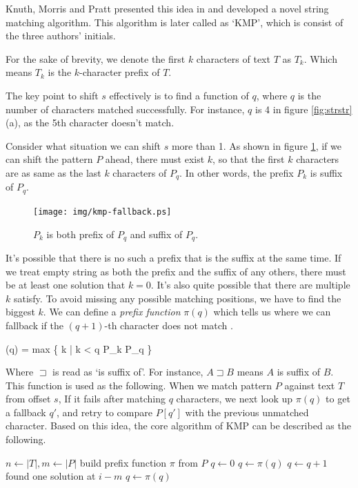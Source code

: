 \documentclass[UTF8]{article}
\begin{document}
Knuth, Morris and Pratt presented this idea in \cite{kmp} and developed a novel string matching algorithm.
This algorithm is later called as `KMP', which is consist of the three authors' initials.

For the sake of brevity, we denote the first $k$ characters of text $T$ as $T_k$. Which means $T_k$ is the $k$-character prefix of $T$.

The key point to shift $s$ effectively is to find a function of $q$, where $q$ is the number of characters
matched successfully. For instance, $q$ is 4 in figure \ref{fig:strstr} (a), as the 5th character doesn't match.

Consider what situation we can shift $s$ more than 1. As shown in figure \ref{fig:kmp-fallback}, if we can
shift the pattern $P$ ahead, there must exist $k$, so that the first $k$ characters are as same as the
last $k$ characters of $P_q$. In other words, the prefix $P_k$ is suffix of $P_q$.

\begin{figure}[htbp]
 \centering
 \texttt{[image: img/kmp-fallback.ps]}
 \caption{$P_k$ is both prefix of $P_q$ and suffix of $P_q$.}
 \label{fig:kmp-fallback}
\end{figure}

It's possible that there is no such a prefix that is the suffix at the same time. If we treat empty string as
both the prefix and the suffix of any others, there must be at least one solution that $k=0$. It's also
quite possible that there are multiple $k$ satisfy. To avoid missing any possible matching positions,
we have to find the biggest $k$.
We can define a {\em prefix function} $\pi(q)$ which tells us where we can fallback if the $(q+1)$-th character does
not match \cite{CLRS}.

\be
\pi(q) = max \{ k | k < q \land P_k \sqsupset P_q \}
\label{eq:prefix-function}
\ee

Where $\sqsupset$ is read as `is suffix of'. For instance, $A \sqsupset B$ means $A$ is suffix
of $B$.
This function is used as the following. When we match pattern $P$ against text $T$ from offset $s$,
If it fails after matching $q$ characters, we next look up $\pi(q)$ to get a fallback $q'$,
and retry to compare $P[q']$ with the previous unmatched character. Based on this idea, the
core algorithm of KMP can be described as the following.

\begin{algorithmic}[1]
  \State $n \gets |T|, m \gets |P|$
  \State build prefix function $\pi$ from $P$
  \State $q \gets 0$ 
      \State $q \gets \pi(q)$
    \EndWhile
      \State $q \gets q + 1$
    \EndIf
      \State found one solution at $i - m$
      \State $q \gets \pi(q)$ 
    \EndIf
  \EndFor
\EndFunction
\end{algorithmic}
\end{document}
